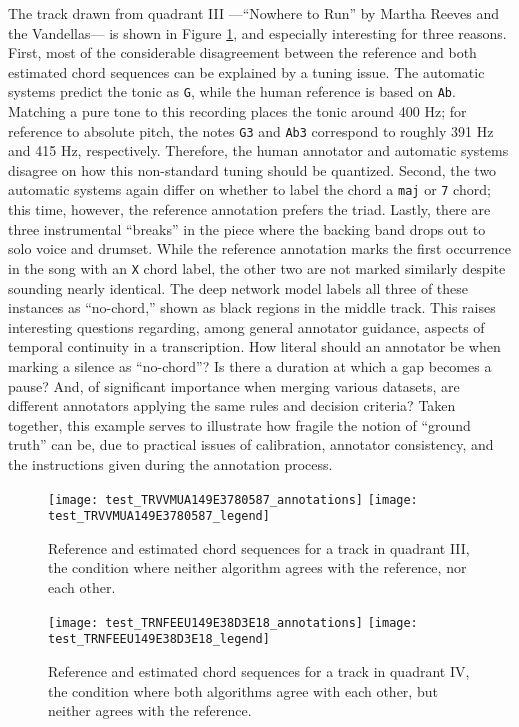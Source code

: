 The track drawn from quadrant III ---``Nowhere to Run'' by Martha Reeves and the Vandellas--- is shown in Figure \ref{fig:test_quadIII}, and especially interesting for three reasons.
First, most of the considerable disagreement between the reference and both estimated chord sequences can be explained by a tuning issue.
The automatic systems predict the tonic as \texttt{G}, while the human reference is based on \texttt{Ab}.
Matching a pure tone to this recording places the tonic around 400 Hz;
for reference to absolute pitch, the notes \texttt{G3} and \texttt{Ab3} correspond to roughly 391 Hz and 415 Hz, respectively.
Therefore, the human annotator and automatic systems disagree on how this non-standard tuning should be quantized.
Second, the two automatic systems again differ on whether to label the chord a \texttt{maj} or \texttt{7} chord;
this time, however, the reference annotation prefers the triad.
Lastly, there are three instrumental ``breaks'' in the piece where the backing band drops out to solo voice and drumset.
While the reference annotation marks the first occurrence in the song with an \texttt{X} chord label, the other two are not marked similarly despite sounding nearly identical.
The deep network model labels all three of these instances as ``no-chord,'' shown as black regions in the middle track.
This raises interesting questions regarding, among general annotator guidance, aspects of temporal continuity in a transcription.
How literal should an annotator be when marking a silence as ``no-chord''?
Is there a duration at which a gap becomes a pause?
And, of significant importance when merging various datasets, are different annotators applying the same rules and decision criteria?
Taken together, this example serves to illustrate how fragile the notion of ``ground truth'' can be, due to practical issues of calibration, annotator consistency, and the instructions given during the annotation process.


\begin{figure}[t!]
\centering
\texttt{[image: test\_TRVVMUA149E3780587\_annotations]}
\texttt{[image: test\_TRVVMUA149E3780587\_legend]}
\caption{Reference and estimated chord sequences for a track in quadrant III, the condition where neither algorithm agrees with the reference, nor each other.}
\label{fig:test_quadIII}
\end{figure}

\begin{figure}[t!]
\centering
\texttt{[image: test\_TRNFEEU149E38D3E18\_annotations]}
\texttt{[image: test\_TRNFEEU149E38D3E18\_legend]}
\caption{Reference and estimated chord sequences for a track in quadrant IV, the condition where both algorithms agree with each other, but neither agrees with the reference.}
\label{fig:test_quadIV}
\end{figure}

